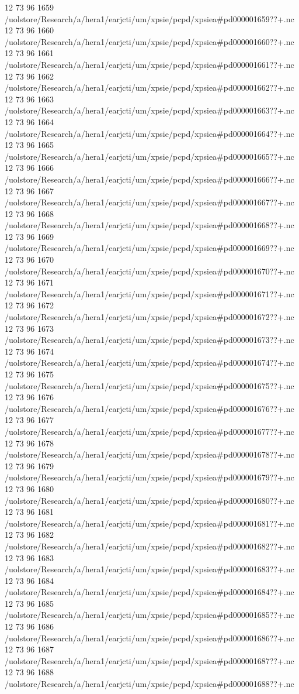 12 73 96
1659
/uolstore/Research/a/hera1/earjcti/um/xpsie/pcpd/xpsiea#pd000001659??+.nc
12 73 96
1660
/uolstore/Research/a/hera1/earjcti/um/xpsie/pcpd/xpsiea#pd000001660??+.nc
12 73 96
1661
/uolstore/Research/a/hera1/earjcti/um/xpsie/pcpd/xpsiea#pd000001661??+.nc
12 73 96
1662
/uolstore/Research/a/hera1/earjcti/um/xpsie/pcpd/xpsiea#pd000001662??+.nc
12 73 96
1663
/uolstore/Research/a/hera1/earjcti/um/xpsie/pcpd/xpsiea#pd000001663??+.nc
12 73 96
1664
/uolstore/Research/a/hera1/earjcti/um/xpsie/pcpd/xpsiea#pd000001664??+.nc
12 73 96
1665
/uolstore/Research/a/hera1/earjcti/um/xpsie/pcpd/xpsiea#pd000001665??+.nc
12 73 96
1666
/uolstore/Research/a/hera1/earjcti/um/xpsie/pcpd/xpsiea#pd000001666??+.nc
12 73 96
1667
/uolstore/Research/a/hera1/earjcti/um/xpsie/pcpd/xpsiea#pd000001667??+.nc
12 73 96
1668
/uolstore/Research/a/hera1/earjcti/um/xpsie/pcpd/xpsiea#pd000001668??+.nc
12 73 96
1669
/uolstore/Research/a/hera1/earjcti/um/xpsie/pcpd/xpsiea#pd000001669??+.nc
12 73 96
1670
/uolstore/Research/a/hera1/earjcti/um/xpsie/pcpd/xpsiea#pd000001670??+.nc
12 73 96
1671
/uolstore/Research/a/hera1/earjcti/um/xpsie/pcpd/xpsiea#pd000001671??+.nc
12 73 96
1672
/uolstore/Research/a/hera1/earjcti/um/xpsie/pcpd/xpsiea#pd000001672??+.nc
12 73 96
1673
/uolstore/Research/a/hera1/earjcti/um/xpsie/pcpd/xpsiea#pd000001673??+.nc
12 73 96
1674
/uolstore/Research/a/hera1/earjcti/um/xpsie/pcpd/xpsiea#pd000001674??+.nc
12 73 96
1675
/uolstore/Research/a/hera1/earjcti/um/xpsie/pcpd/xpsiea#pd000001675??+.nc
12 73 96
1676
/uolstore/Research/a/hera1/earjcti/um/xpsie/pcpd/xpsiea#pd000001676??+.nc
12 73 96
1677
/uolstore/Research/a/hera1/earjcti/um/xpsie/pcpd/xpsiea#pd000001677??+.nc
12 73 96
1678
/uolstore/Research/a/hera1/earjcti/um/xpsie/pcpd/xpsiea#pd000001678??+.nc
12 73 96
1679
/uolstore/Research/a/hera1/earjcti/um/xpsie/pcpd/xpsiea#pd000001679??+.nc
12 73 96
1680
/uolstore/Research/a/hera1/earjcti/um/xpsie/pcpd/xpsiea#pd000001680??+.nc
12 73 96
1681
/uolstore/Research/a/hera1/earjcti/um/xpsie/pcpd/xpsiea#pd000001681??+.nc
12 73 96
1682
/uolstore/Research/a/hera1/earjcti/um/xpsie/pcpd/xpsiea#pd000001682??+.nc
12 73 96
1683
/uolstore/Research/a/hera1/earjcti/um/xpsie/pcpd/xpsiea#pd000001683??+.nc
12 73 96
1684
/uolstore/Research/a/hera1/earjcti/um/xpsie/pcpd/xpsiea#pd000001684??+.nc
12 73 96
1685
/uolstore/Research/a/hera1/earjcti/um/xpsie/pcpd/xpsiea#pd000001685??+.nc
12 73 96
1686
/uolstore/Research/a/hera1/earjcti/um/xpsie/pcpd/xpsiea#pd000001686??+.nc
12 73 96
1687
/uolstore/Research/a/hera1/earjcti/um/xpsie/pcpd/xpsiea#pd000001687??+.nc
12 73 96
1688
/uolstore/Research/a/hera1/earjcti/um/xpsie/pcpd/xpsiea#pd000001688??+.nc
